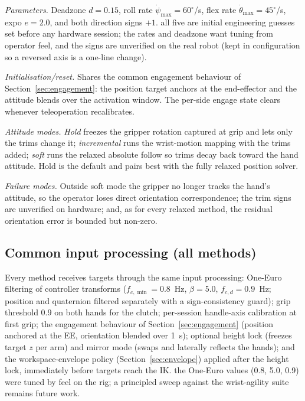 \emph{Parameters.} Deadzone \(d=0.15\), roll rate
\(\dot\psi_{\max}=60^\circ\)/s, flex rate \(\dot\theta_{\max}=45^\circ\)/s,
expo \(e=2.0\), and both direction signs \(+1\).
\unjustified{} all five are initial engineering guesses set before any
hardware session; the rates and deadzone want tuning from operator feel,
and the signs are unverified on the real robot (kept in configuration so
a reversed axis is a one-line change).

\emph{Initialisation/reset.} Shares the common engagement behaviour of
Section~\ref{sec:engagement}: the position target anchors at the
end-effector and the attitude blends over the activation window. The
per-side engage state clears whenever teleoperation recalibrates.

\emph{Attitude modes.} \emph{Hold} freezes the gripper rotation captured
at grip and lets only the trims change it; \emph{incremental} runs the
wrist-motion mapping with the trims added; \emph{soft} runs the relaxed
absolute follow so trims decay back toward the hand attitude. Hold is the
default and pairs best with the fully relaxed position solver.

\emph{Failure modes.} Outside soft mode the gripper no longer tracks the
hand's attitude, so the operator loses direct orientation
correspondence; the trim signs are unverified on hardware; and, as for
every relaxed method, the residual orientation error is bounded but
non-zero.

\subsection{Common input processing (all methods)}
\label{app:common-input}

Every method receives targets through the same input processing:
One-Euro filtering of controller transforms
(\(f_{c,\min}=0.8\)~Hz, \(\beta=5.0\), \(f_{c,d}=0.9\)~Hz; position and
quaternion filtered separately with a sign-consistency guard); grip
threshold 0.9 on both hands for the clutch; per-session handle-axis
calibration at first grip; the engagement behaviour of
Section~\ref{sec:engagement} (position anchored at the EE, orientation
blended over 1~s); optional height lock (freezes target \(z\) per arm)
and mirror mode (swaps and laterally reflects the hands); and the
workspace-envelope policy (Section~\ref{sec:envelope}) applied after the
height lock, immediately before targets reach the IK.
\unjustified{} the One-Euro values (0.8, 5.0, 0.9) were
tuned by feel on the rig; a principled sweep against the wrist-agility
suite remains future work.

